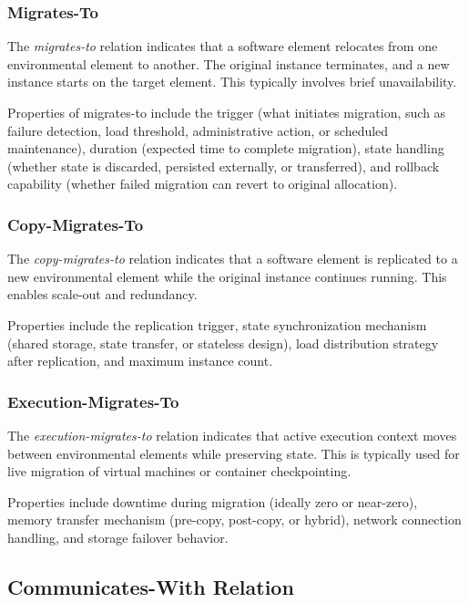 \documentclass[11pt]{article}
\begin{document}
\subsubsection{Migrates-To}

The \textit{migrates-to} relation indicates that a software element relocates from one environmental element to another. The original instance terminates, and a new instance starts on the target element. This typically involves brief unavailability.

Properties of migrates-to include the trigger (what initiates migration, such as failure detection, load threshold, administrative action, or scheduled maintenance), duration (expected time to complete migration), state handling (whether state is discarded, persisted externally, or transferred), and rollback capability (whether failed migration can revert to original allocation).

\subsubsection{Copy-Migrates-To}

The \textit{copy-migrates-to} relation indicates that a software element is replicated to a new environmental element while the original instance continues running. This enables scale-out and redundancy.

Properties include the replication trigger, state synchronization mechanism (shared storage, state transfer, or stateless design), load distribution strategy after replication, and maximum instance count.

\subsubsection{Execution-Migrates-To}

The \textit{execution-migrates-to} relation indicates that active execution context moves between environmental elements while preserving state. This is typically used for live migration of virtual machines or container checkpointing.

Properties include downtime during migration (ideally zero or near-zero), memory transfer mechanism (pre-copy, post-copy, or hybrid), network connection handling, and storage failover behavior.

\subsection{Communicates-With Relation}
\end{document}

